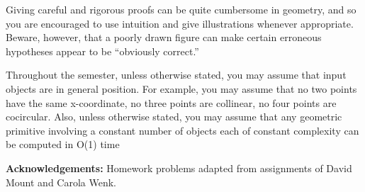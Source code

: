\documentclass[11pt]{article}
\begin{document}
Giving careful and rigorous proofs can be quite cumbersome in geometry, and so
you are encouraged to use intuition and give illustrations whenever appropriate.
Beware, however, that a poorly drawn figure can make certain erroneous
hypotheses appear to be ``obviously correct.''

Throughout the semester, unless otherwise stated, you may assume that input
objects are in general position. For example, you may assume that no two points
have the same x-coordinate, no three points are collinear, no four points are
cocircular. Also, unless otherwise stated, you may assume that any geometric
primitive involving a constant number of objects each of constant complexity can
be computed in O(1) time

{\bf Acknowledgements:} Homework problems adapted from assignments of David
Mount and Carola Wenk.
\end{document}
